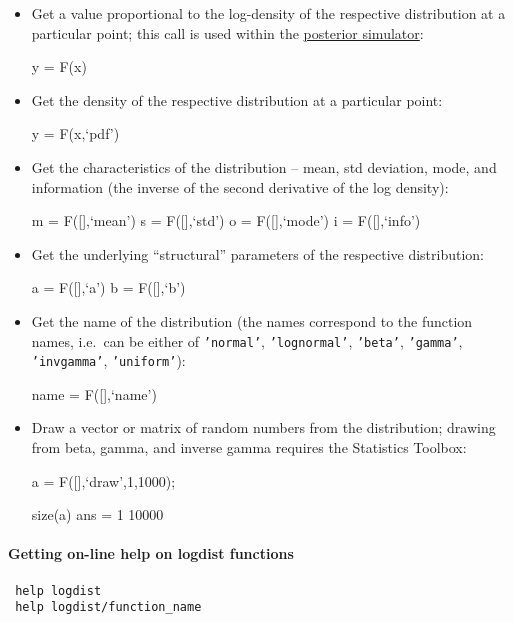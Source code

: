  \begin{itemize}
 \item
   Get a value proportional to the log-density of the respective
   distribution at a particular point; this call is used within the
   \href{poster/Contents}{posterior simulator}:
 
   y = F(x)
 \item
   Get the density of the respective distribution at a particular point:
 
   y = F(x,`pdf')
 \item
   Get the characteristics of the distribution -- mean, std deviation,
   mode, and information (the inverse of the second derivative of the log
   density):
 
   m = F({[}{]},`mean') s = F({[}{]},`std') o = F({[}{]},`mode') i =
   F({[}{]},`info')
 \item
   Get the underlying ``structural'' parameters of the respective
   distribution:
 
   a = F({[}{]},`a') b = F({[}{]},`b')
 \item
   Get the name of the distribution (the names correspond to the function
   names, i.e.~can be either of \texttt{'normal'}, \texttt{'lognormal'},
   \texttt{'beta'}, \texttt{'gamma'}, \texttt{'invgamma'},
   \texttt{'uniform'}):
 
   name = F({[}{]},`name')
 \item
   Draw a vector or matrix of random numbers from the distribution;
   drawing from beta, gamma, and inverse gamma requires the Statistics
   Toolbox:
 
   a = F({[}{]},`draw',1,1000);
 
   size(a) ans = 1 10000
 \end{itemize}
 
 \paragraph{Getting on-line help on logdist functions}
 
 \begin{verbatim}
 help logdist
 help logdist/function_name
 \end{verbatim}




